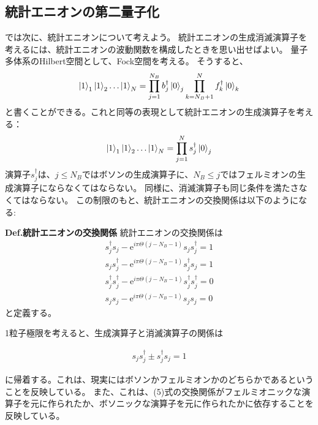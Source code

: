 \documentclass[a4paper,11pt]{jsarticle}
\begin{document}
\subsection{統計エニオンの第二量子化}
では次に、統計エニオンについて考えよう。
統計エニオンの生成消滅演算子を考えるには、統計エニオンの波動関数を構成したときを思い出せばよい。
量子多体系のHilbert空間として、Fock空間を考える。
そうすると、
\begin{align}
\ket{1}_1\ket{1}_2\dots\ket{1}_N=\prod _{j=1}^{N_B}b_j^{\dag}\ket{0}_j\prod _{k=N_B+1}^{N}f_k^{\dag}\ket{0}_k
\end{align}
と書くことができる。これと同等の表現として統計エニオンの生成演算子を考える：
\begin{align}
  \ket{1}_1\ket{1}_2\dots\ket{1}_N=\prod _{j=1}^{N}s_j^{\dag}\ket{0}_j
\end{align}
演算子$s_j^{\dag}$は、$j\leq N_B$ではボソンの生成演算子に、$N_B\leq j$ではフェルミオンの生成演算子にならなくてはならない。
同様に、消滅演算子も同じ条件を満たさなくてはならない。
この制限のもと、統計エニオンの交換関係は以下のようになる:\\

\begin{itembox}[l]{\textbf{Def.統計エニオンの交換関係 }}
  統計エニオンの交換関係は
\begin{align}
s_j^{\dag}s_j-\mathrm{e}^{i\pi\Theta(j-N_B-1)}s_j s_j^{\dag}=1\\
s_js_j^{\dag}-\mathrm{e}^{i\pi\Theta(j-N_B-1)}s_j^{\dag} s_j=1\\
s_j^{\dag}s_j^{\dag}-\mathrm{e}^{i\pi\Theta(j-N_B-1)}s_j^{\dag} s_j^{\dag}=0\\
s_js_j-\mathrm{e}^{i\pi\Theta(j-N_B-1)}s_j s_j=0
\end{align}
と定義する。
\end{itembox}

1粒子極限を考えると、生成演算子と消滅演算子の関係は

\begin{align}
s_js_j^{\dag}\pm s_j^{\dag}s_j=1
\end{align}

に帰着する。これは、現実にはボソンかフェルミオンかのどちらかであるということを反映している。
また、これは、(5)式の交換関係がフェルミオニックな演算子を元に作られたか、ボソニックな演算子を元に作られたかに依存することを反映している。
\end{document}
